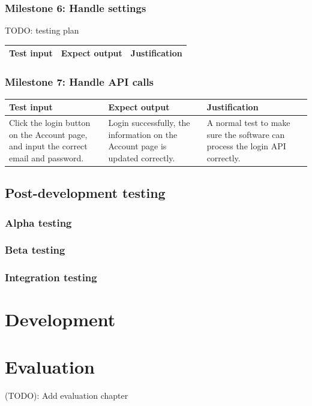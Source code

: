\documentclass[a4paper]{report}
\begin{document}
\subsection{Milestone 6: Handle settings}

TODO: testing plan

\begin{tabulary}{\textwidth}{|L|L|L|}
    \hline
    Test input & Expect output & Justification \\
    \hline
\end{tabulary}

\subsection{Milestone 7: Handle API calls}

\begin{tabulary}{\textwidth}{|L|L|L|}
    \hline
    Test input & Expect output & Justification \\
    \hline
    Click the login button on the Account page, and input the correct email and password. & Login successfully, the information on the Account page is updated correctly. & A normal test to make sure the software can process the login API correctly. \\
    \hline
\end{tabulary}

\section{Post-development testing}

\subsection{Alpha testing}
\subsection{Beta testing}
\subsection{Integration testing}

\chapter{Development}


\chapter{Evaluation}

 (TODO): Add evaluation chapter
\end{document}
